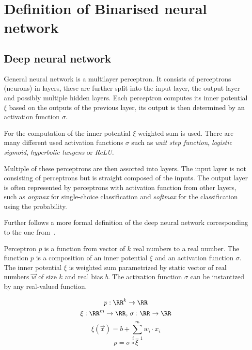 \section{Definition of Binarised neural network}

\subsection{Deep neural network}

General neural network is a multilayer perceptron. It consists of perceptrons (neurons) in layers,
these are further split into the input layer, the output layer and possibly multiple
hidden layers. Each perceptron computes its inner potential $\xi$ based on the outputs of
the previous layer, its output is then determined by an activation function $\sigma$.

For the computation of the inner potential $\xi$ weighted sum is used.
There are many different used activation functions $\sigma$ such as
\textit{unit step function}, \textit{logistic sigmoid},
\textit{hyperbolic tangens} or \textit{ReLU}.

Multiple of these perceptrons are then assorted into layers. The input layer is not
consisting of perceptrons but is straight composed of the inputs. The output layer is
often represented by perceptrons with activation function from other layers, such as
\textit{argmax} for single-choice classification and
\textit{softmax} for the classification using the probability.

Further follows a more formal definition of the deep neural network
corresponding to the one from~\cite{Bishop1995NeuralNF}.

\sectionsep{}

\begin{definition}[Perceptron]
Perceptron $p$ is a function from vector of $k$ real numbers to a real number.
The function $p$ is a composition of an inner potential $\xi$
and an activation function $\sigma$. The inner potential $\xi$ is weighted sum
parametrized by static vector of real numbers
$\vec w$ of size $k$ and real bias $b$.
The activation function $\sigma$ can be instantized by any real-valued function.

\begin{equation*}
	p: \RR^k \to \RR
\end{equation*}
\begin{equation*}
	\xi: \RR^m \to \RR, \,
	\sigma: \RR \to \RR
\end{equation*}
\begin{equation*}
	\xi(\vec x) = b + \sum_{i=1}^m w_i\cdot x_i
\end{equation*}
\begin{equation*}
	p = \sigma \circ \xi
\end{equation*}
\end{definition}

